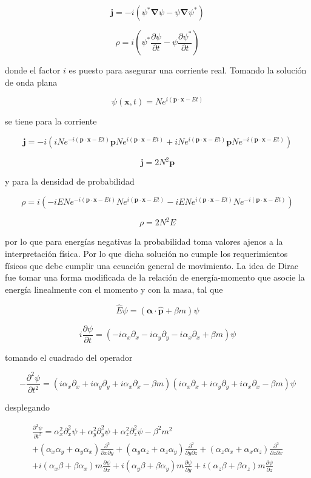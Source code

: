 $$ \textbf{j} = -i(\psi^*\boldsymbol\nabla \psi - \psi\boldsymbol\nabla \psi^*) $$

$$ \rho = i\left( \psi^*\frac{\partial \psi}{\partial t} - \psi\frac{\partial \psi^*}{\partial t} \right) $$

donde el factor $i$ es puesto para asegurar una corriente real. Tomando la solución de onda plana

$$ \psi(\textbf{x},t) = Ne^{i(\textbf{p}\cdot\textbf{x} - Et)} $$

se tiene para la corriente

$$ \textbf{j} = -i(iNe^{-i(\textbf{p}\cdot\textbf{x} - Et)}\textbf{p} Ne^{i(\textbf{p}\cdot\textbf{x} - Et)}+iNe^{i(\textbf{p}\cdot\textbf{x} - Et)}\textbf{p}Ne^{-i(\textbf{p}\cdot\textbf{x} - Et)})$$

$$ \textbf{j} = 2N^2\textbf{p} $$

y para la densidad de probabilidad

$$ \rho = i(-iENe^{-i(\textbf{p}\cdot\textbf{x} - Et)}Ne^{i(\textbf{p}\cdot\textbf{x} - Et)} -iENe^{i(\textbf{p}\cdot\textbf{x} - Et)}Ne^{-i(\textbf{p}\cdot\textbf{x} - Et)})$$

$$ \rho = 2N^2E $$

por lo que para energías negativas la probabilidad toma valores ajenos a la interpretación física. Por lo que dicha solución no cumple los requerimientos físicos que debe cumplir una ecuación general de movimiento. La idea de Dirac fue tomar una forma modificada de la relación de energía-momento que asocie la energía linealmente con el momento y con la masa, tal que

$$ \hat{E}\psi = (\boldsymbol\alpha \cdot \hat{\textbf{p}} + \beta m)\psi $$

$$ i\frac{\partial \psi}{\partial t} = \left( -i\alpha_x\partial_x -i\alpha_y\partial_y -i\alpha_x\partial_x +\beta m \right)\psi $$

tomando el cuadrado del operador 

$$ -\frac{\partial^2 \psi}{\partial t^2} = \left( i\alpha_x\partial_x +i\alpha_y\partial_y +i\alpha_x\partial_x -\beta m \right)\left( i\alpha_x\partial_x +i\alpha_y\partial_y +i\alpha_x\partial_x -\beta m \right)\psi $$

desplegando

\begin{multline}
    \frac{\partial^2 \psi}{\partial t^2} = \alpha_x^2 \partial_x^2\psi + \alpha_y^2 \partial_y^2\psi + \alpha_z^2 \partial_z^2\psi - \beta^2m^2 \\
    +(\alpha_x \alpha_y + \alpha_y \alpha_x)\frac{\partial^2}{\partial x \partial y}+(\alpha_y \alpha_z + \alpha_z \alpha_y)\frac{\partial^2}{\partial y \partial z}+(\alpha_z \alpha_x + \alpha_x \alpha_z)\frac{\partial^2}{\partial z \partial x}\\
    +i(\alpha_x \beta + \beta \alpha_x)m\frac{\partial \psi}{\partial x} +i(\alpha_y \beta + \beta \alpha_y)m\frac{\partial \psi}{\partial y}+i(\alpha_z \beta + \beta \alpha_z)m\frac{\partial \psi}{\partial z}
\end{multline}

